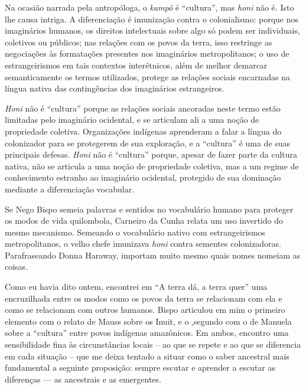 Na ocasião narrada pela antropóloga, o \textit{kampô} é \enquote{cultura}, mas \textit{honi} não é. Isto lhe causa intriga. A diferenciação é imunização contra o colonialismo: porque nos imaginários humanos, os direitos intelectuais sobre algo só podem ser individuais, coletivos ou públicos; nas relações com os povos da terra, isso restringe as negociações às formatações presentes nos imaginários metropolitanos; o uso de estrangeirismos em tais contextos interétnicos, além de melhor demarcar semanticamente os termos utilizados, protege as relações sociais encarnadas na língua nativa das contingências dos imaginários estrangeiros.

\textit{Honi} não é \enquote{cultura} porque as relações sociais ancoradas neste termo estão limitadas pelo imaginário ocidental, e se articulam ali a uma noção de propriedade coletiva. Organizações indígenas aprenderam a falar a língua do colonizador para se protegerem de sua exploração, e a \enquote{cultura} é uma de suas principais defesas. \textit{Honi} não é \enquote{cultura} porque, apesar de fazer parte da cultura nativa, não se articula a uma noção de propriedade coletiva, mas a um regime de conhecimento estranho ao imaginário ocidental, protegido de sua dominação mediante a diferenciação vocabular.

Se Nego Bispo semeia palavras e sentidos no vocabulário humano para proteger os modos de vida quilombola, Carneiro da Cunha relata um uso invertido do mesmo mecanismo. Semeando o vocabulário nativo com estrangeirismos metropolitanos, o velho chefe imunizava \textit{honi} contra sementes colonizadoras. Parafraseando Donna Haraway, importam muito mesmo quais nomes nomeiam as coisas.

Como eu havia dito ontem, encontrei em \enquote{A terra dá, a terra quer} uma encruzilhada entre os modos como os povos da terra se relacionam com ela e como se relacionam com outros humanos. Bispo articulou em mim o primeiro elemento com o relato de Mauss sobre os Inuit, e o ,segundo com o de Manuela sobre a \enquote{cultura} entre povos indígenas amazônicos. Em ambos, encontro uma sensibilidade fina às circunstâncias locais -- ao que se repete e ao que se diferencia em cada situação -- que me deixa tentado a situar como o saber ancestral mais fundamental a seguinte proposição: sempre escutar e aprender a escutar as diferenças --- as ancestrais e as emergentes.


